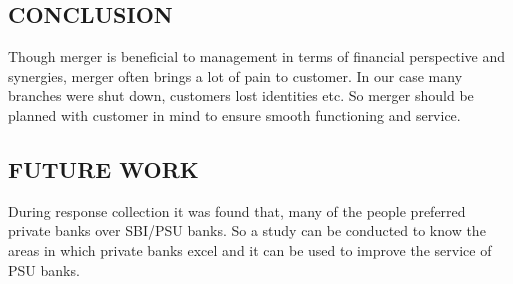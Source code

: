 \documentclass[a4paper, 14pt]{extarticle}
\begin{document}
{\subsection{CONCLUSION}
Though merger is beneficial to management in terms of financial perspective and synergies, merger often brings a lot of pain to customer. In our case many branches were shut down, customers lost identities etc. So merger should be planned with customer in mind to ensure smooth functioning and service.

\subsection{FUTURE WORK}
During response collection it was found that, many of the people preferred private banks over SBI/PSU banks. So a study can be conducted to know the areas in which private banks excel and it can be used to improve the service of PSU banks.


\newpage
}
\end{document}
